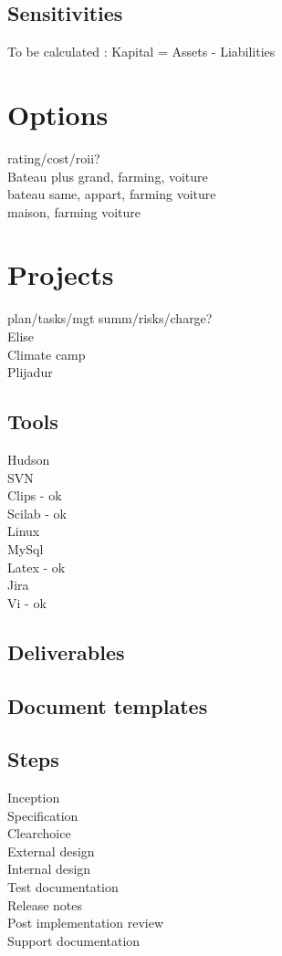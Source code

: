 \documentclass[8pt]{article} %
\begin{document}
\subsection{Sensitivities}
To be calculated : Kapital = Assets - Liabilities


\section{Options}
rating/cost/roii?\\

Bateau plus grand, farming, voiture\\
bateau same, appart, farming voiture\\
maison, farming voiture\\


\section{Projects}

plan/tasks/mgt summ/risks/charge?\\

Elise\\
Climate camp\\
Plijadur\\

\subsection{Tools}
Hudson\\
SVN\\
Clips - ok\\
Scilab - ok\\
Linux\\
MySql\\
Latex - ok\\
Jira\\
Vi - ok\\

\subsection{Deliverables}
\subsection{Document templates}
\subsection{Steps}
Inception\\
Specification\\
Clearchoice\\
External design\\
Internal design\\
Test documentation\\
Release notes\\
Post implementation review\\
Support documentation\\
\end{document}
